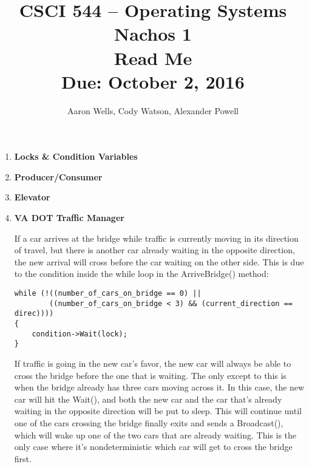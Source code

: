 \documentclass[10pt]{article} %
\title{CSCI 544 -- Operating Systems Nachos 1 \\
Read Me \\
{\large{\bf Due: October 2, 2016}}}
\date{}
\author{Aaron Wells, Cody Watson, Alexander Powell}
\begin{document}
\maketitle
\begin{enumerate}

\item %

\textbf{Locks \& Condition Variables}

\item %

\textbf{Producer/Consumer}

\item %

\textbf{Elevator}

\item %

\textbf{VA DOT Traffic Manager}

If a car arrives at the bridge while traffic is currently moving in its direction of travel, but there is another car already waiting in the opposite direction, the new arrival will cross before the car waiting on the other side.  This is due to the condition inside the while loop in the ArriveBridge() method:

\begin{verbatim}
while (!((number_of_cars_on_bridge == 0) || 
        ((number_of_cars_on_bridge < 3) && (current_direction == direc))))
{
    condition->Wait(lock);
}
\end{verbatim}

If traffic is going in the new car's favor, the new car will always be able to cross the bridge before the one that is waiting.  The only except to this is when the bridge already has three cars moving across it.  In this case, the new car will hit the Wait(), and both the new car and the car that's already waiting in the opposite direction will be put to sleep.  This will continue until one of the cars crossing the bridge finally exits and sends a Broadcast(), which will wake up one of the two cars that are already waiting.  This is the only case where it's nondeterministic which car will get to cross the bridge first.  

\end{enumerate}
\end{document}
